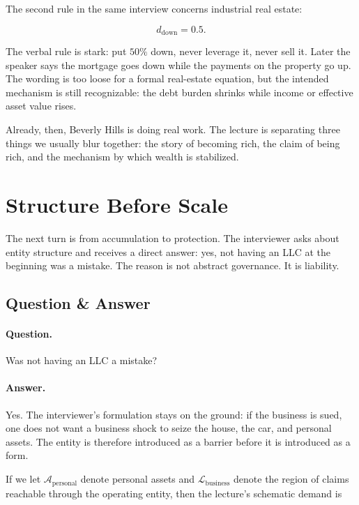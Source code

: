 The second rule in the same interview concerns industrial real estate:

\begin{equation}
d_{\mathrm{down}} = 0.5.
\end{equation}

The verbal rule is stark: put \(50\%\) down, never leverage it, never sell it. Later the speaker says the mortgage goes down while the payments on the property go up. The wording is too loose for a formal real-estate equation, but the intended mechanism is still recognizable: the debt burden shrinks while income or effective asset value rises.

Already, then, Beverly Hills is doing real work. The lecture is separating three things we usually blur together: the story of becoming rich, the claim of being rich, and the mechanism by which wealth is stabilized.

\section{Structure Before Scale}

The next turn is from accumulation to protection. The interviewer asks about entity structure and receives a direct answer: yes, not having an LLC at the beginning was a mistake. The reason is not abstract governance. It is liability.

\subsection{Question \& Answer}

\paragraph{Question.}
Was not having an LLC a mistake?

\paragraph{Answer.}
Yes. The interviewer's formulation stays on the ground: if the business is sued, one does not want a business shock to seize the house, the car, and personal assets. The entity is therefore introduced as a barrier before it is introduced as a form.

If we let \(\mathcal{A}_{\mathrm{personal}}\) denote personal assets and \(\mathcal{L}_{\mathrm{business}}\) denote the region of claims reachable through the operating entity, then the lecture's schematic demand is

